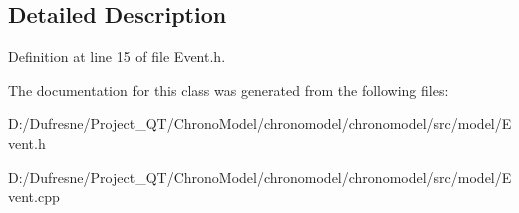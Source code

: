 \subsection{Detailed Description}


Definition at line 15 of file Event.\-h.



The documentation for this class was generated from the following files\-:\begin{DoxyCompactItemize}
\item 
D\-:/\-Dufresne/\-Project\-\_\-\-Q\-T/\-Chrono\-Model/chronomodel/chronomodel/src/model/Event.\-h\item 
D\-:/\-Dufresne/\-Project\-\_\-\-Q\-T/\-Chrono\-Model/chronomodel/chronomodel/src/model/Event.\-cpp\end{DoxyCompactItemize}
